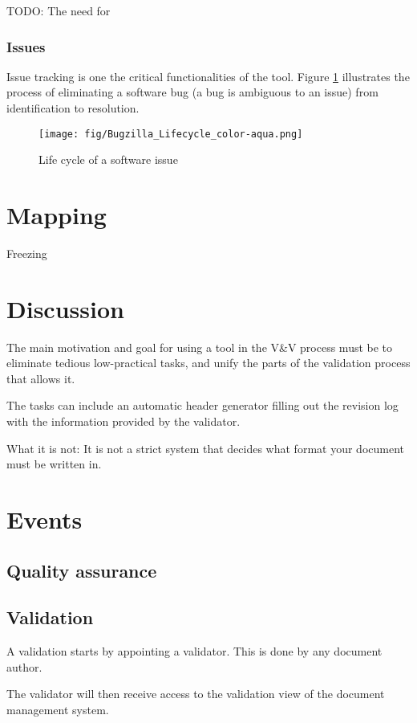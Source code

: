 \documentclass[10pt,a4paper]{article}
\begin{document}
TODO: The need for 


\subsubsection{Issues}
Issue tracking is one the critical functionalities of the tool. Figure \ref{fig:software_issue_life_cycle} illustrates the process of eliminating a software bug (a bug is ambiguous to an issue) from identification to resolution.


\begin{figure}[h]
\centering
\texttt{[image: fig/Bugzilla\_Lifecycle\_color-aqua.png]} 
\caption{Life cycle of a software issue}
\label{fig:software_issue_life_cycle}
\end{figure}


\section{Mapping}
Freezing 

\section{Discussion}
The main motivation and goal for using a tool in the V\&V process must be to eliminate tedious low-practical tasks, and unify the parts of the validation process that allows it.

The tasks can include an automatic header generator filling out the revision log with the information provided by the validator.

What it is not:
It is not a strict system that decides what format your document must be written in.

\section{Events}
\subsection{Quality assurance}

\subsection{Validation}
A validation starts by appointing a validator. This is done by any document author.

The validator will then receive access to the validation view of the document management system.
\end{document}
